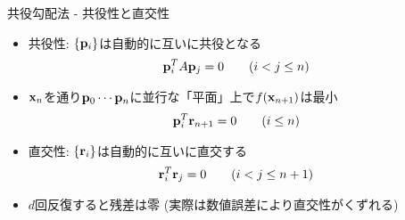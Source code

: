 \begin{frame}[t,fragile]{共役勾配法 - 共役性と直交性}
  \begin{itemize}
    \setlength{\itemsep}{1em}
  \item 共役性: $\{{\bf p}_i\}$は自動的に互いに共役となる
    \begin{align*}
      {\bf p}_i^T A {\bf p}_j &= 0 \qquad \text{($i < j \le n$)}
    \end{align*}
  \item ${\bf x}_n$を通り${\bf p}_0 \cdots {\bf p}_n$に並行な「平面」上で$f({\bf x}_{n+1})$は最小
    \begin{align*}
      {\bf p}_i^T {\bf r}_{n+1} &= 0 \qquad \text{($i \le n$)}
    \end{align*}
  \item 直交性: $\{{\bf r}_i\}$は自動的に互いに直交する
    \begin{align*}
      {\bf r}_i^T {\bf r}_j &= 0 \qquad \text{($i < j \le n+1$)}
    \end{align*}
  \item $d$回反復すると残差は零 (実際は数値誤差により直交性がくずれる)
  \end{itemize}
\end{frame}
